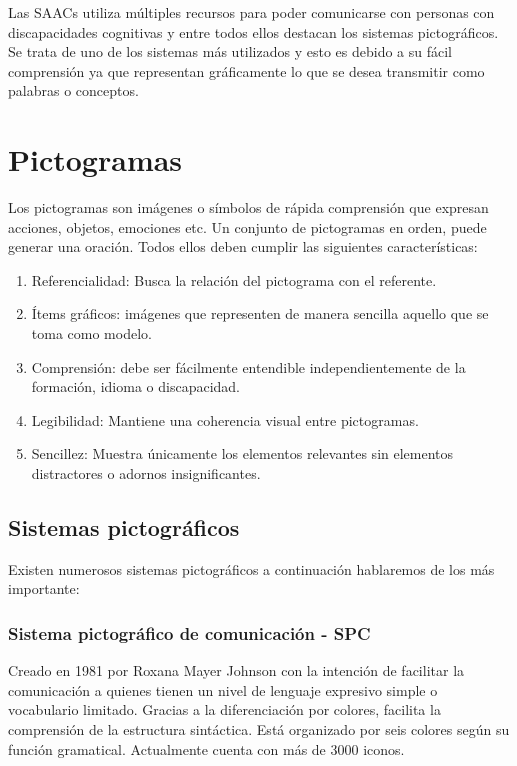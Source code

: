 Las SAACs utiliza múltiples recursos para poder comunicarse con personas con discapacidades cognitivas y entre todos ellos destacan los sistemas pictográficos. Se trata de uno de los sistemas más utilizados y esto es debido a su fácil comprensión ya que representan gráficamente lo que se desea transmitir como palabras o conceptos. 

\section{Pictogramas}
Los pictogramas son imágenes o símbolos de rápida comprensión que expresan acciones, objetos, emociones etc. Un conjunto de pictogramas en orden, puede generar una oración. Todos ellos deben cumplir las siguientes características:
\begin{enumerate}
	\item Referencialidad: Busca la relación del pictograma con el referente.
	\item Ítems gráficos: imágenes que representen de manera sencilla aquello que se toma como modelo.
	\item Comprensión: debe ser fácilmente entendible independientemente de la formación, idioma o discapacidad.
	\item Legibilidad: Mantiene una coherencia visual entre pictogramas.
	\item Sencillez: Muestra únicamente los elementos relevantes sin elementos distractores o adornos insignificantes.
\end{enumerate}

\subsection{Sistemas pictográficos}
Existen numerosos sistemas pictográficos a continuación hablaremos de los más importante:

\subsubsection{Sistema pictográfico de comunicación - SPC}

Creado en 1981 por Roxana Mayer Johnson con la intención de facilitar la comunicación a quienes tienen un nivel de lenguaje expresivo simple o vocabulario limitado. Gracias a la diferenciación por colores, facilita la comprensión de la estructura sintáctica. Está organizado por seis colores según su función gramatical. Actualmente cuenta con más de 3000 iconos.

